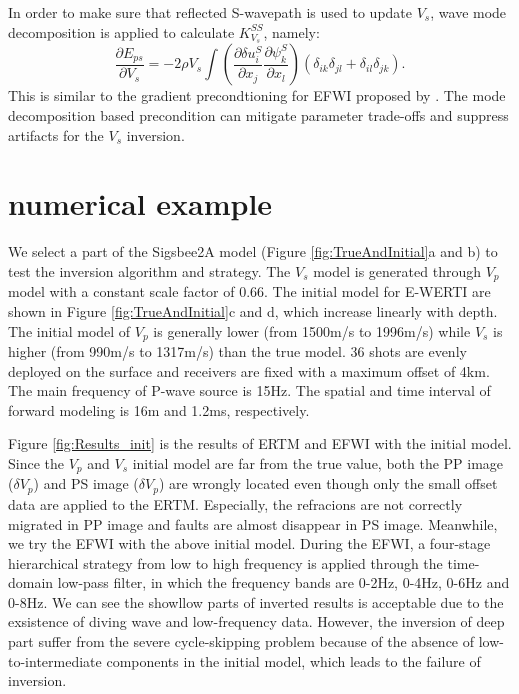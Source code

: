 In order to make sure that reflected S-wavepath is used to update $V_s$, wave mode decomposition 
is applied to calculate $K^{SS}_{V_s}$, namely:
\begin{equation}
	\frac{\partial E_{ps}}{\partial V_s}=-2\rho V_s
	\int (\frac{\partial \delta u^S_{i}}{\partial
    x_j}\frac{\partial \psi^S_{k}}{\partial x_l})
	(\delta_{ik}\delta_{jl}+
	\delta_{il}\delta_{jk}).
    \label{eq:GradientVel_MD}
\end{equation}
This is similar to the gradient precondtioning for EFWI proposed by \cite{WangEtAl2017}. The mode
decomposition based precondition can mitigate parameter trade-offs and suppress artifacts for the
$V_s$ inversion.
\section{numerical example}
We select a part of the Sigsbee2A model (Figure
\ref{fig:TrueAndInitial}a and b) to test the inversion algorithm and strategy.
The $V_s$ model is generated through $V_p$ model with a constant scale factor of 0.66. 
The initial model for E-WERTI are shown in 
Figure \ref{fig:TrueAndInitial}c and d, which increase linearly with depth.
The initial model of $V_p$ is generally lower (from 1500m/s to 1996m/s) while 
$V_s$ is higher  (from 990m/s to 1317m/s) than the true model. 
36 shots are evenly deployed on the surface and receivers are
fixed with a maximum offset of 4km. 
The main frequency of P-wave source is 15Hz.
The spatial and time interval of forward modeling is 16m and 1.2ms, respectively.

Figure \ref{fig:Results_init} is the results of ERTM and EFWI with the initial model. Since the
$V_p$ and $V_s$ initial model are far from the true value, both the PP image ($\delta V_p$) and PS
image ($\delta V_p$) are wrongly located even though only the small offset data are applied to the
ERTM. Especially, the refracions are not correctly migrated in PP image and faults are almost
disappear in PS image. Meanwhile, we try the EFWI with the above initial model. 
During the EFWI, 
a four-stage hierarchical strategy 
from low to high frequency is applied through the time-domain low-pass filter, in which the frequency bands
are 0-2Hz, 0-4Hz, 0-6Hz and 0-8Hz. 
We can see the showllow parts of inverted results 
is acceptable due to the exsistence of diving wave and low-frequency data. However, the inversion of
deep part suffer from the severe cycle-skipping problem because of the absence of
low-to-intermediate components in the initial model, which leads to the failure of inversion.

